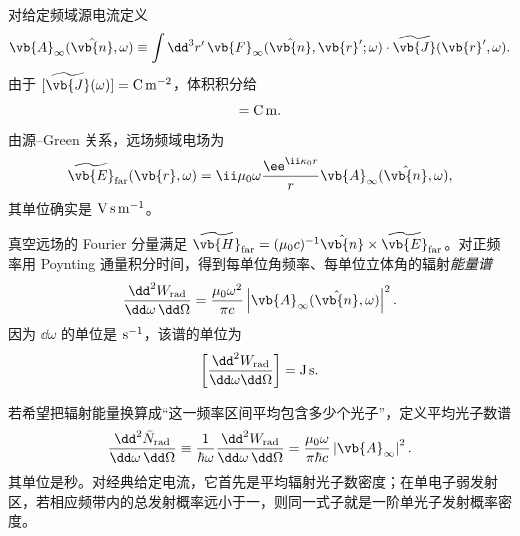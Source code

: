对给定频域源电流定义
\begin{equation}
{
\vb{A}_\infty(\hat{\vb{n}},\omega)
\equiv
\int\dd^3 r'\,
\vb{F}_\infty
(\hat{\vb{n}},\vb{r}';\omega)
\cdot\widetilde{\vb{J}}(\vb{r}',\omega).}
\label{eq:far_field_source_amplitude}
\end{equation}
由于 $[\widetilde{\vb{J}}(\omega)]={\rm C\,m^{-2}}$，体积积分给
\begin{equation*}
[\vb{A}_\infty]={\rm C\,m}.
\end{equation*}
由源--Green 关系，远场频域电场为
\begin{equation*}
\widetilde{\vb{E}}_{\rm far}(\vb{r},\omega)
=\ii\mu_0\omega\frac{\ee^{\ii\kappa_0 r}}{r}
\vb{A}_\infty(\hat{\vb{n}},\omega),
\end{equation*}
其单位确实是 ${\rm V\,s\,m^{-1}}$。

真空远场的 Fourier 分量满足 $\widetilde{\vb{H}}_{\rm far}=(\mu_0c)^{-1}\hat{\vb{n}}\times\widetilde{\vb{E}}_{\rm far}$。对正频率用 Poynting 通量积分时间，得到每单位角频率、每单位立体角的辐射\emph{能量谱}
\begin{equation}
{
\frac{\dd^2 W_{\rm rad}}{\dd\omega\,\dd\Omega}
=
\frac{\mu_0\omega^2}{\pi c}
\left|\vb{A}_\infty(\hat{\vb{n}},\omega)\right|^2.}
\label{eq:far_field_radiated_energy_green_si}
\end{equation}
因为 $\dd\omega$ 的单位是 ${\rm s^{-1}}$，该谱的单位为
\begin{equation*}
\left[\frac{\dd^2 W_{\rm rad}}{\dd\omega\dd\Omega}\right]
={\rm J\,s}.
\end{equation*}

若希望把辐射能量换算成“这一频率区间平均包含多少个光子”，定义平均光子数谱
\begin{equation}
{
\frac{\dd^2 \bar N_{\rm rad}}{\dd\omega\,\dd\Omega}
\equiv
\frac{1}{\hbar\omega}
\frac{\dd^2 W_{\rm rad}}{\dd\omega\,\dd\Omega}
=
\frac{\mu_0\omega}{\pi\hbar c}
\left|\vb{A}_\infty\right|^2.}
\label{eq:cl_photon_probability_far_green}
\end{equation}
其单位是秒。对经典给定电流，它首先是平均辐射光子数密度；在单电子弱发射区，若相应频带内的总发射概率远小于一，则同一式子就是一阶单光子发射概率密度。

